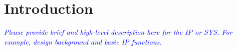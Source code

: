 
\clearpage

\section{Introduction} 
\noindent\textit{\textcolor{blue}{Please provide brief and high-level description here for the IP or SYS. For example, design background and basic IP functions.}}